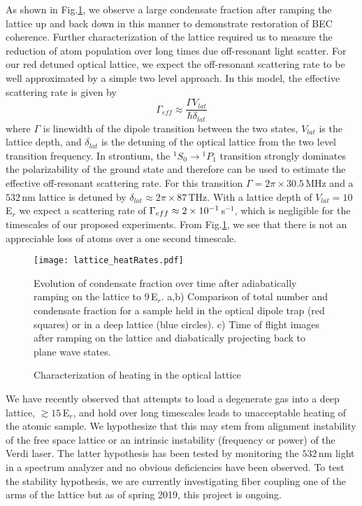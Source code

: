 As shown in Fig.\;\ref{fig:heatingRates}, we observe a large condensate fraction after ramping the lattice up and back down in this manner to demonstrate restoration of BEC coherence.
Further characterization of the lattice required us to measure the reduction of atom population over long times due off-resonant light scatter.
For our red detuned optical lattice, we expect the off-resonant scattering rate to be well approximated by a simple two level approach. 
In this model, the effective scattering rate is given by \cite{Jaksch2005}
	\begin{equation} \label{eq:offResScatter}
		\Gamma_{eff} \approx \frac{\Gamma V_{lat}}{\hbar \delta_{lat}}
	\end{equation}
where $\Gamma$ is linewidth of the dipole transition between the two states, $V_{lat}$ is the lattice depth, and $\delta_{lat}$ is the detuning of the optical lattice from the two level transition frequency.
In strontium, the $^1S_0\!\rightarrow\!^1P_1$ transition strongly dominates the polarizability of the ground state and therefore can be used to estimate the effective off-resonant scattering rate.
For this transition $\Gamma = 2 \pi \times 30.5\,$MHz and a $532$\,nm lattice is detuned by $\delta_{lat} \approx 2 \pi \times 87\,$THz.
With a lattice depth of $V_{lat}=10\,$E$_r$ we expect a scattering rate of $\Gamma_{eff} \approx 2\times 10^{-1}\,$s$^{-1}$, which is negligible for the timescales of our proposed experiments.
From Fig.\;\ref{fig:heatingRates}, we see that there is not an appreciable loss of atoms over a one second timescale.
	\begin{figure}
	\centerline{
		\texttt{[image: lattice\_heatRates.pdf]}}
		\caption{Characterization of heating in the optical lattice}{Evolution of condensate fraction over time after adiabatically ramping on the lattice to 9\,E$_r$. a,b) Comparison of total number and condensate fraction for a sample held in the optical dipole trap (red squares) or in a deep lattice (blue circles). c) Time of flight images after ramping on the lattice and diabatically projecting back to plane wave states.}
		 \label{fig:heatingRates}
	\end{figure}
We have recently observed that attempts to load a degenerate gas into a deep lattice, $\gtrsim 15$\,E$_r$, and hold over long timescales leads to unacceptable heating of the atomic sample.
We hypothesize that this may stem from alignment instability of the free space lattice or an intrinsic instability (frequency or power) of the Verdi laser.
The latter hypothesis has been tested by monitoring the $532$\,nm light in a spectrum analyzer and no obvious deficiencies have been observed.
To test the stability hypothesis, we are currently investigating fiber coupling one of the arms of the lattice but as of spring 2019, this project is ongoing.



